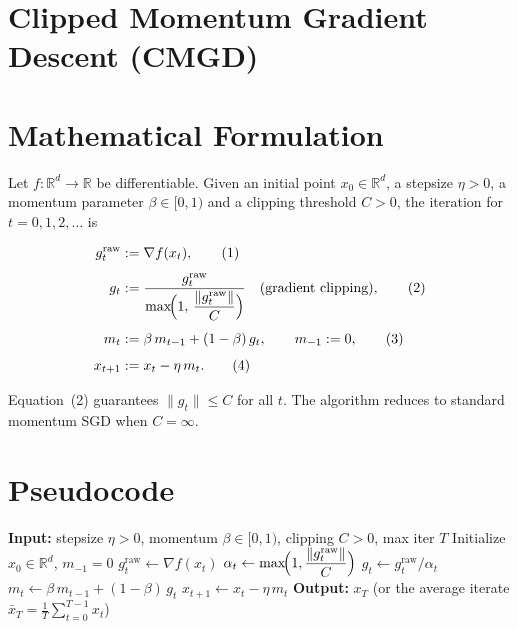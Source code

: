 \documentclass{article}
\begin{document}
\section*{Clipped Momentum Gradient Descent (CMGD)}

\section*{Mathematical Formulation}
Let $f:\mathbb{R}^d\rightarrow\mathbb{R}$ be differentiable.  
Given an initial point $x_0\in\mathbb{R}^d$, a stepsize $\eta>0$, a momentum
parameter $\beta\in[0,1)$ and a clipping threshold $C>0$, the iteration
for $t=0,1,2,\dots$ is

\begin{align}
g^{\text{raw}}_t &:= \nabla f(x_t), \tag{1}\\[4pt]
g_t &:= \frac{g^{\text{raw}}_t}{\displaystyle \max\!\Bigl(1,\,
\frac{\|g^{\text{raw}}_t\|}{C}\Bigr)}\quad\text{(gradient clipping)}, \tag{2}\\[4pt]
m_t &:= \beta\, m_{t-1} + (1-\beta)\, g_t,\qquad m_{-1}:=0, \tag{3}\\[4pt]
x_{t+1} &:= x_t - \eta\, m_t . \tag{4}
\end{align}

Equation~(2) guarantees $\|g_t\|\le C$ for all $t$.
The algorithm reduces to standard momentum SGD when $C=\infty$.

\vspace{0.3cm}
\section*{Pseudocode}
\begin{algorithm}[H]
\caption{Clipped Momentum Gradient Descent}
\begin{algorithmic}[1]
\State \textbf{Input:} stepsize $\eta>0$, momentum $\beta\in[0,1)$, clipping $C>0$, max iter $T$
\State Initialize $x_0\in\mathbb{R}^d$, $m_{-1}=0$
    \State $g^{\text{raw}}_t \gets \nabla f(x_t)$
    \State $\displaystyle \alpha_t \gets \max\!\Bigl(1,\frac{\|g^{\text{raw}}_t\|}{C}\Bigr)$
    \State $g_t \gets g^{\text{raw}}_t/\alpha_t$ 
    \State $m_t \gets \beta\, m_{t-1} + (1-\beta)\, g_t$
    \State $x_{t+1} \gets x_t - \eta\, m_t$
\EndFor
\State \textbf{Output:} $x_T$ (or the average iterate $\bar x_T=\frac1T\sum_{t=0}^{T-1}x_t$)
\end{algorithmic}
\end{algorithm}
\end{document}
